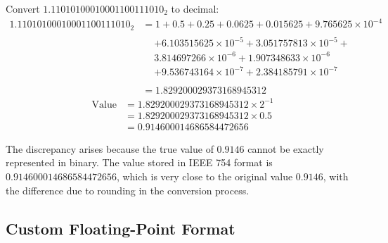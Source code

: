 \documentclass{ioereport}
\begin{document}
Convert \(1.11010100010001100111010_2\) to decimal:
\begin{align*}
    1.11010100010001100111010_2 &= 1 + 0.5 + 0.25 + 0.0625 + 0.015625 + 9.765625 \times 10^{-4}\\
        &\begin{aligned}
        &+ 6.103515625 \times 10^{-5} + 3.051757813 \times 10^{-5} + \\
        & 3.814697266 \times 10^{-6} + 1.907348633 \times 10^{-6}\\
        &+ 9.536743164 \times 10^{-7} + 2.384185791 \times 10^{-7}\\
    \end{aligned}\\
        &= 1.829200029373168945312
\end{align*}
\begin{equation}
    \begin{aligned}
        \text{Value} &= 1.829200029373168945312 \times 2^{-1}\\
        &= 1.829200029373168945312 \times 0.5\\
        &= 0.914600014686584472656
    \end{aligned}
\end{equation}

The discrepancy arises because the true value of \(0.9146\) cannot be exactly represented in binary. The value stored in IEEE 754 format is \(0.914600014686584472656\), which is very close to the original value \(0.9146\), with the difference due to rounding in the conversion process.

\pagebreak


\setcounter{subsection}{4}
\subsection{Custom Floating-Point Format}
\label{app:custom-floating-point-formats}
\end{document}
